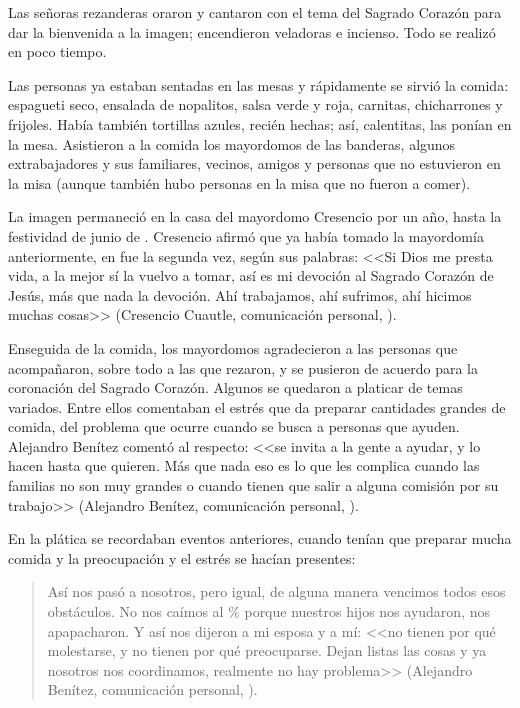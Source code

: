 \documentclass[14pt,letterpaper,twoside]{extbook} %
\begin{document}
Las señoras rezanderas oraron y cantaron con el tema del Sagrado Corazón para dar la bienvenida a la imagen; encendieron veladoras e incienso. Todo se realizó en poco tiempo.

Las personas ya estaban sentadas en las mesas y rápidamente se sirvió la comida: espagueti seco, ensalada de nopalitos, salsa verde y roja, carnitas, chicharrones y frijoles. Había también tortillas azules, recién hechas; así, calentitas, las ponían en la mesa. Asistieron a la
comida los mayordomos de las banderas, algunos extrabajadores y sus familiares, vecinos, amigos y personas que no estuvieron en la misa (aunque también hubo personas en la misa que no fueron a comer).

La imagen permaneció en la casa del mayordomo Cresencio por un año, hasta la festividad de junio de . Cresencio afirmó que ya había tomado la mayordomía anteriormente, en  fue la segunda vez, según sus palabras: <<Si Dios me presta vida, a la mejor sí la vuelvo a tomar, así es mi devoción al Sagrado Corazón de Jesús, más que nada la devoción. Ahí trabajamos, ahí sufrimos, ahí hicimos muchas cosas>> (Cresencio Cuautle, comunicación personal, ).

Enseguida de la comida, los mayordomos agradecieron a las personas que acompañaron, sobre todo a las que rezaron, y se pusieron de acuerdo para la coronación del Sagrado Corazón. Algunos se quedaron a platicar de temas variados. Entre ellos comentaban el estrés que da preparar cantidades grandes de comida, del problema que ocurre cuando se busca a personas que ayuden. Alejandro Benítez comentó al respecto: <<se invita a la gente a ayudar, y lo hacen hasta que quieren. Más que nada eso es lo que les complica cuando las familias no son muy grandes o cuando tienen que salir a alguna comisión por su trabajo>> (Alejandro Benítez, comunicación personal, ).

En la plática se recordaban eventos anteriores, cuando tenían que preparar mucha comida y la preocupación y el estrés se hacían presentes:

\begin{quotation}
\noindent Así nos pasó a nosotros, pero igual, de alguna manera vencimos todos esos obstáculos. No nos caímos al \% porque nuestros hijos nos ayudaron, nos apapacharon. Y así nos dijeron a mi esposa y a mí: <<no tienen por qué molestarse, y no tienen por qué preocuparse. Dejan listas las cosas y ya nosotros nos coordinamos, realmente no hay problema>> (Alejandro Benítez, comunicación personal, ).
\end{quotation}
\end{document}
